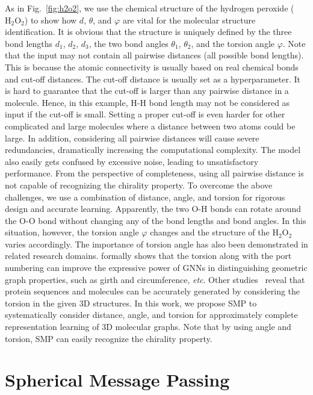 \documentclass{article}
\begin{document}
As in Fig.~\ref{fig:h2o2}, we use the chemical structure of the hydrogen peroxide ($\mbox{H}_2\mbox{O}_2$) to show how $d$, $\theta$, and $\varphi$ are vital
for the molecular structure identification.
It is obvious that the structure is uniquely defined by the three bond lengths 
$d_1$, $d_2$, $d_3$,
the two bond angles $\theta_1$, $\theta_2$,
and the torsion angle $\varphi$.
Note that the input may not contain all pairwise distances (all possible bond lengths).
This is because the atomic connectivity is usually based on
real chemical bonds and cut-off distances.
\textcolor{COLOR}{The cut-off distance is usually set as a hyperparameter.
It is hard to guarantee that the cut-off is larger than any pairwise distance in a molecule.
Hence, in this example, H-H bond length may not be considered as input
if the cut-off is small.
Setting a proper cut-off is even harder for other complicated and large molecules
where a distance between two atoms could be large.
In addition, considering all pairwise distances will cause severe redundancies,
dramatically increasing the computational complexity.
The model also easily gets confused by excessive noise,
leading to unsatisfactory performance.
From the perspective of completeness,
using all pairwise distance is not capable of recognizing
the chirality property.
To overcome the above challenges, we use a combination of distance, angle, and torsion
for rigorous design and accurate learning.}
Apparently, the two O-H bonds can rotate around the O-O bond
without changing any of the bond lengths and bond angles.
In this situation, however,
the torsion angle $\varphi$ changes and the structure of the $\mbox{H}_2\mbox{O}_2$
varies accordingly.
The importance of
torsion angle has also been demonstrated in related research domains.
\cite{garg2020generalization} formally shows that
the torsion along with the port numbering can improve
the expressive power of GNNs in distinguishing geometric graph properties, such as
girth and circumference, \emph{etc}.
Other studies~\citep{ingraham2019generative,simm2020reinforcement}
reveal that protein sequences and molecules can be accurately generated by
considering the torsion in the given 3D structures.
In this work, we propose SMP to systematically consider distance, angle,
and torsion
for approximately complete representation learning of 3D molecular graphs.
\textcolor{COLOR}{Note that by using angle and torsion, SMP can easily 
recognize the chirality property.
}

\section{Spherical Message Passing} \label{sec:smp}
\end{document}
